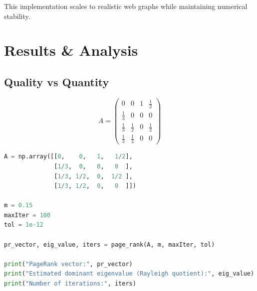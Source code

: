 \documentclass[11pt]{article}
\begin{document}
\noindent This implementation scales to realistic web graphs while maintaining numerical stability.







\newpage
\section{Results \& Analysis}

\subsection{Quality vs Quantity}

\begin{figure}[h!]
\centering
\begin{minipage}{0.45\textwidth}
\centering
{}
\end{minipage}
\hfill
\begin{minipage}{0.45\textwidth}
\centering
\[
A =
\begin{pmatrix}
0 & 0 & 1 & \tfrac12 \\
\tfrac13 & 0 & 0 & 0 \\
\tfrac13 & \tfrac12 & 0 & \tfrac12 \\
\tfrac13 & \tfrac12 & 0 & 0
\end{pmatrix}
\]
\end{minipage}
\end{figure}


\begin{lstlisting}[language=Python]
A = np.array([[0,    0,   1,   1/2],
              [1/3,  0,   0,   0  ],
              [1/3, 1/2,  0,  1/2 ],
              [1/3, 1/2,  0,   0  ]])

m = 0.15
maxIter = 100
tol = 1e-12

pr_vector, eig_value, iters = page_rank(A, m, maxIter, tol)

print("PageRank vector:", pr_vector)
print("Estimated dominant eigenvalue (Rayleigh quotient):", eig_value)
print("Number of iterations:", iters)
\end{lstlisting}
\end{document}
